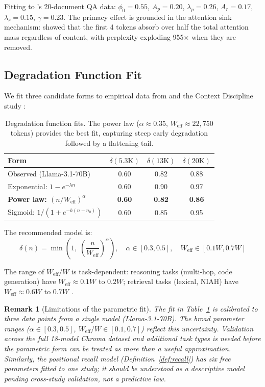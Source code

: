 \documentclass[11pt, a4paper, logo, copyright]{googledeepmind}
\newtheorem*{remark}{Remark}
\begin{document}
Fitting to \citet{liu2024lost}'s 20-document QA data: $\phi_0 = 0.55$, $A_p = 0.20$, $\lambda_p = 0.26$, $A_r = 0.17$, $\lambda_r = 0.15$, $\gamma = 0.23$. The primacy effect is grounded in the attention sink mechanism: \citet{xiao2024efficient} showed that the first 4 tokens absorb over half the total attention mass regardless of content, with perplexity exploding 955$\times$ when they are removed.

\subsection{Degradation Function Fit}

We fit three candidate forms to empirical data from \citet{du2025context} and the Context Discipline study \citep{contextdiscipline2025}:

\begin{table}[h]
\centering
\small
\begin{tabular}{lccc}
\toprule
\textbf{Form} & \textbf{$\delta(5.3\text{K})$} & \textbf{$\delta(13\text{K})$} & \textbf{$\delta(20\text{K})$} \\
\midrule
Observed (Llama-3.1-70B) & 0.60 & 0.82 & 0.88 \\
Exponential: $1 - e^{-\lambda n}$ & 0.60 & 0.90 & 0.97 \\
\textbf{Power law: $(n/W_{\text{eff}})^\alpha$} & \textbf{0.60} & \textbf{0.82} & \textbf{0.86} \\
Sigmoid: $1/(1+e^{-k(n-n_0)})$ & 0.60 & 0.85 & 0.95 \\
\bottomrule
\end{tabular}
\caption{Degradation function fits. The power law ($\alpha \approx 0.35$, $W_{\text{eff}} \approx 22{,}750$ tokens) provides the best fit, capturing steep early degradation followed by a flattening tail.}
\label{tab:degradation-fit}
\end{table}

The recommended model is:
$$\delta(n) = \min\!\left(1, \;\left(\frac{n}{W_{\text{eff}}}\right)^{\!\alpha}\right), \quad \alpha \in [0.3, 0.5], \quad W_{\text{eff}} \in [0.1W, 0.7W]$$

The range of $W_{\text{eff}}/W$ is task-dependent: reasoning tasks (multi-hop, code generation) have $W_{\text{eff}} \approx 0.1W$ to $0.2W$; retrieval tasks (lexical, NIAH) have $W_{\text{eff}} \approx 0.6W$ to $0.7W$ \citep{kuratov2024babilong, hsieh2024ruler}.

\begin{remark}[Limitations of the parametric fit]
The fit in Table~\ref{tab:degradation-fit} is calibrated to three data points from a single model (Llama-3.1-70B). The broad parameter ranges ($\alpha \in [0.3, 0.5]$, $W_{\text{eff}}/W \in [0.1, 0.7]$) reflect this uncertainty. Validation across the full 18-model Chroma dataset and additional task types is needed before the parametric form can be treated as more than a useful approximation. Similarly, the positional recall model (Definition~\ref{def:recall}) has six free parameters fitted to one study; it should be understood as a descriptive model pending cross-study validation, not a predictive law.
\end{remark}
\end{document}
